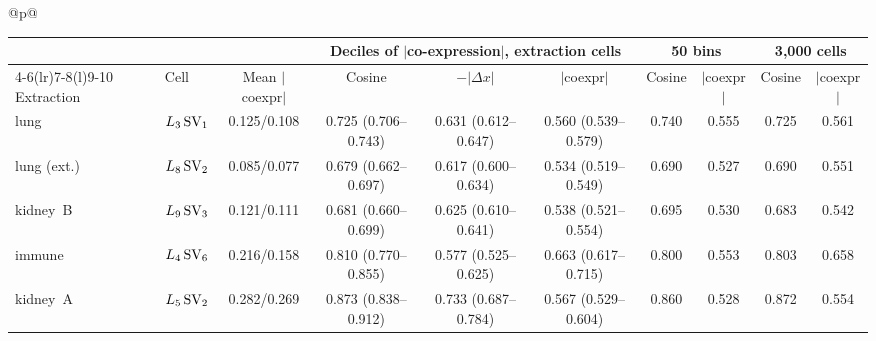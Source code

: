 \begin{longtable}{@{}p{\textwidth}@{}}
{\scriptsize\begin{tabular*}{\textwidth}{@{\extracolsep{\fill}}llcccccccc@{}}
& & & \multicolumn{3}{c}{Deciles of $|$co-expression$|$, extraction cells} & \multicolumn{2}{c}{50 bins} & \multicolumn{2}{c}{3,000 cells} \\
\cmidrule(lr){4-6}\cmidrule(lr){7-8}\cmidrule(l){9-10}
Extraction & Cell & Mean $|$coexpr$|$ & Cosine & $-|\Delta x|$ & $|$coexpr$|$ & Cosine & $|$coexpr$|$ & Cosine & $|$coexpr$|$ \\
\midrule
lung & $L_{3}\,\mathrm{SV}_{1}$ & 0.125/0.108 & 0.725 (0.706--0.743) & 0.631 (0.612--0.647) & 0.560 (0.539--0.579) & 0.740 & 0.555 & 0.725 & 0.561 \\
lung (ext.) & $L_{8}\,\mathrm{SV}_{2}$ & 0.085/0.077 & 0.679 (0.662--0.697) & 0.617 (0.600--0.634) & 0.534 (0.519--0.549) & 0.690 & 0.527 & 0.690 & 0.551 \\
kidney~B & $L_{9}\,\mathrm{SV}_{3}$ & 0.121/0.111 & 0.681 (0.660--0.699) & 0.625 (0.610--0.641) & 0.538 (0.521--0.554) & 0.695 & 0.530 & 0.683 & 0.542 \\
immune & $L_{4}\,\mathrm{SV}_{6}$ & 0.216/0.158 & 0.810 (0.770--0.855) & 0.577 (0.525--0.625) & 0.663 (0.617--0.715) & 0.800 & 0.553 & 0.803 & 0.658 \\
kidney~A & $L_{5}\,\mathrm{SV}_{2}$ & 0.282/0.269 & 0.873 (0.838--0.912) & 0.733 (0.687--0.784) & 0.567 (0.529--0.604) & 0.860 & 0.528 & 0.872 & 0.554 \\
\end{tabular*}}\\
\\
\midrule

\end{longtable}
